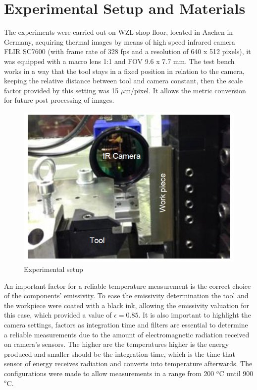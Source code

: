 	\section{Experimental Setup and Materials}
	\label{sec:exSetup}

		The experiments were carried out on WZL shop floor, located in Aachen in Germany, acquiring thermal images by means of high speed infrared camera FLIR SC7600 (with frame rate of 328 fps and a resolution of 640 x 512 pixels), it was equipped with a macro lens 1:1 and FOV 9.6 x 7.7 mm. The test bench works in a way that the tool stays in a fixed position in relation to the camera, keeping the relative distance between tool and camera constant, then the scale factor provided by this setting was 15 $\mu$m/pixel. It allows the metric conversion for future post processing of images.

		\begin{figure}[H]
			\centering
			\captionsetup{justification=centering}
			\includegraphics[scale = 0.5]{Cap3/exsetup.png}
			\caption{Experimental setup \cite{augspurger2016experimental}}
			\label{fig:exinfrared}
		\end{figure}

		An important factor for a reliable temperature measurement is the correct choice of the components' emissivity. To ease the emissivity determination the tool and the workpiece were coated with a black ink, allowing the emissivity valuation for this case, which provided a value of $\epsilon = 0.85$. It is also important to highlight the camera settings, factors as integration time and filters are essential to determine a reliable measurements due to the amount of electromagnetic radiation received on camera's sensors. The higher are the temperatures higher is the energy produced and smaller should be the integration time, which is the time that sensor of energy receives radiation and converts into temperature afterwards. The configurations were made to allow measurements in a range from 200 $^{o}$C until 900 $^{o}$C.
	
